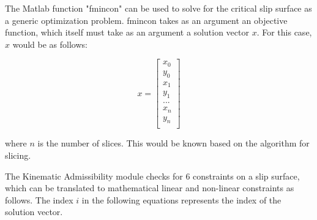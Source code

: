 \documentclass[12pt]{article}
\begin{document}
The Matlab function "fmincon" can be used to solve for the critical slip 
surface as a generic optimization problem. fmincon takes as an argument an 
objective function, which itself must take as an argument a solution vector 
$x$. For this case, $x$ would be as follows:

\begin{equation*}
x = \begin{bmatrix}
x_0 \\
y_0 \\
x_1 \\
y_1 \\
... \\
x_n \\
y_n \\
\end{bmatrix}
\end{equation*}

where $n$ is the number of slices. This would be known based on the algorithm 
for slicing. 

The Kinematic Admissibility module checks for 6 constraints on a slip surface, 
which can be translated to mathematical linear and non-linear constraints as 
follows. The index $i$ in the following equations represents the index of the 
solution vector.
\end{document}
